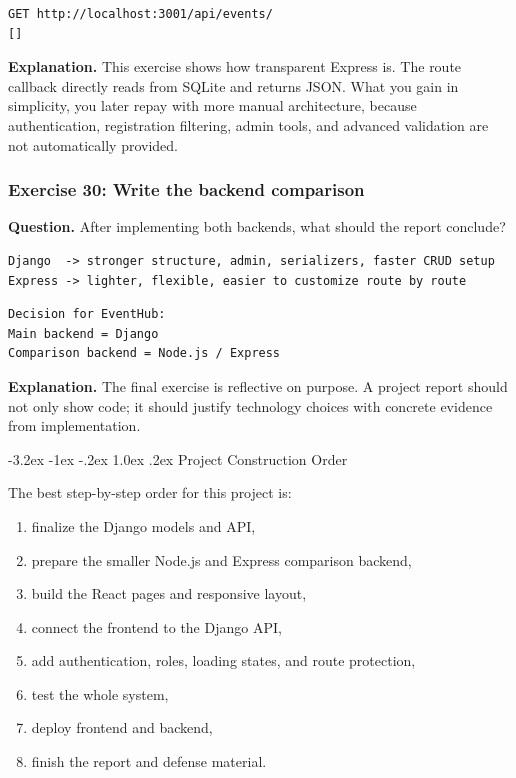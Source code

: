 \documentclass[11pt,a4paper]{article}
\makeatletter
\renewcommand\section{\@startsection{section}{1}{\z@}%
  {-3.2ex \@plus -1ex \@minus -.2ex}%
  {1.0ex \@plus .2ex}%
  {\normalfont\Large\sffamily\bfseries\color{ink}}}
\makeatother
\begin{document}
\begin{lstlisting}[style=terminal]
GET http://localhost:3001/api/events/
[]
\end{lstlisting}

\textbf{Explanation.} This exercise shows how transparent Express is. The route callback directly reads from SQLite and returns JSON. What you gain in simplicity, you later repay with more manual architecture, because authentication, registration filtering, admin tools, and advanced validation are not automatically provided.

\subsubsection*{Exercise 30: Write the backend comparison}
\textbf{Question.} After implementing both backends, what should the report conclude?

\begin{lstlisting}[style=code]
Django  -> stronger structure, admin, serializers, faster CRUD setup
Express -> lighter, flexible, easier to customize route by route
\end{lstlisting}

\begin{lstlisting}[style=terminal]
Decision for EventHub:
Main backend = Django
Comparison backend = Node.js / Express
\end{lstlisting}

\textbf{Explanation.} The final exercise is reflective on purpose. A project report should not only show code; it should justify technology choices with concrete evidence from implementation.

\section{Project Construction Order}

The best step-by-step order for this project is:

\begin{enumerate}
  \item finalize the Django models and API,
  \item prepare the smaller Node.js and Express comparison backend,
  \item build the React pages and responsive layout,
  \item connect the frontend to the Django API,
  \item add authentication, roles, loading states, and route protection,
  \item test the whole system,
  \item deploy frontend and backend,
  \item finish the report and defense material.
\end{enumerate}
\end{document}
